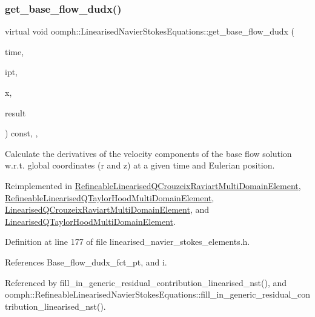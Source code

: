 \subsubsection{\texorpdfstring{get\+\_\+base\+\_\+flow\+\_\+dudx()}{get\_base\_flow\_dudx()}}
{\footnotesize\ttfamily virtual void oomph\+::\+Linearised\+Navier\+Stokes\+Equations\+::get\+\_\+base\+\_\+flow\+\_\+dudx (\begin{DoxyParamCaption}\item[{const double \&}]{time,  }\item[{const unsigned \&}]{ipt,  }\item[{const \hyperlink{classoomph_1_1Vector}{Vector}$<$ double $>$ \&}]{x,  }\item[{\hyperlink{classoomph_1_1DenseMatrix}{Dense\+Matrix}$<$ double $>$ \&}]{result }\end{DoxyParamCaption}) const\hspace{0.3cm}{\ttfamily [inline]}, {\ttfamily [protected]}, {\ttfamily [virtual]}}



Calculate the derivatives of the velocity components of the base flow solution w.\+r.\+t. global coordinates (r and z) at a given time and Eulerian position. 



Reimplemented in \hyperlink{classRefineableLinearisedQCrouzeixRaviartMultiDomainElement_ae30ee573668da667c4ee9bdadd47b905}{Refineable\+Linearised\+Q\+Crouzeix\+Raviart\+Multi\+Domain\+Element}, \hyperlink{classRefineableLinearisedQTaylorHoodMultiDomainElement_ad22978ef877f7a79f05a613a9aa101fd}{Refineable\+Linearised\+Q\+Taylor\+Hood\+Multi\+Domain\+Element}, \hyperlink{classLinearisedQCrouzeixRaviartMultiDomainElement_a3be73b81d6e0cb9b9fba706620966a82}{Linearised\+Q\+Crouzeix\+Raviart\+Multi\+Domain\+Element}, and \hyperlink{classLinearisedQTaylorHoodMultiDomainElement_a6475d80b5a628ad3fbdf8ad2a354617d}{Linearised\+Q\+Taylor\+Hood\+Multi\+Domain\+Element}.



Definition at line 177 of file linearised\+\_\+navier\+\_\+stokes\+\_\+elements.\+h.



References Base\+\_\+flow\+\_\+dudx\+\_\+fct\+\_\+pt, and i.



Referenced by fill\+\_\+in\+\_\+generic\+\_\+residual\+\_\+contribution\+\_\+linearised\+\_\+nst(), and oomph\+::\+Refineable\+Linearised\+Navier\+Stokes\+Equations\+::fill\+\_\+in\+\_\+generic\+\_\+residual\+\_\+contribution\+\_\+linearised\+\_\+nst().

